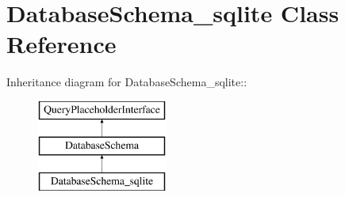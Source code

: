 \hypertarget{classDatabaseSchema__sqlite}{
\section{DatabaseSchema\_\-sqlite Class Reference}
\label{classDatabaseSchema__sqlite}
}
Inheritance diagram for DatabaseSchema\_\-sqlite::\begin{figure}[H]
\begin{center}
\leavevmode
\includegraphics[height=3cm]{classDatabaseSchema__sqlite}
\end{center}
\end{figure}
